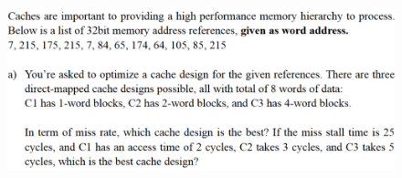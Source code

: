 \documentclass[cn,12pt]{homework}
\begin{document}
\begin{problem}
  \quad
  \begin{figure}[H]
    \centering
    \includegraphics[width=1\textwidth]{./figures/image7.png}
    \label{fig:pro1}
  \end{figure}

\end{problem}
\newpage
\end{document}
